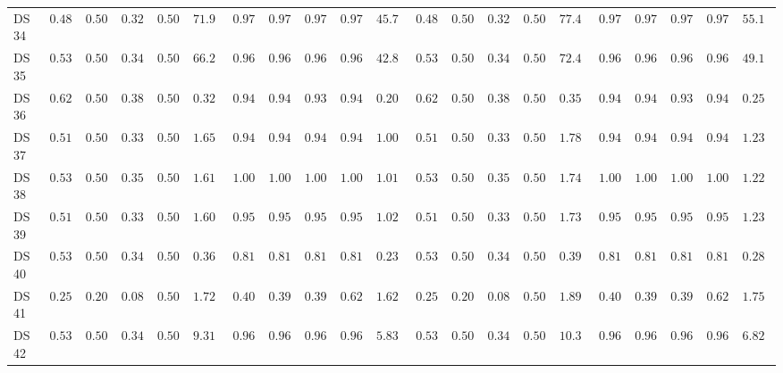 {\begin{longtable}{|l|ccccc|ccccc|ccccc|ccccc|}
		DS 34 & $0.4880$ & $0.5000$ & $0.3280$ & $0.5000$ & $71.9346$ & $0.9747$ & $0.9744$ & $0.9746$ & $0.9744$ & $\boldsymbol{45.7499}$ & $0.4880$ & $0.5000$ & $0.3280$ & $0.5000$ & $77.4863$ & $0.9747$ & $0.9744$ & $0.9746$ & $0.9744$ & $55.1961$ \\
		DS 35 & $0.5333$ & $0.5000$ & $0.3478$ & $0.5000$ & $66.2620$ & $0.9681$ & $0.9682$ & $0.9679$ & $0.9682$ & $\boldsymbol{42.8288}$ & $0.5333$ & $0.5000$ & $0.3478$ & $0.5000$ & $72.4235$ & $0.9681$ & $0.9682$ & $0.9679$ & $0.9682$ & $49.1942$ \\
		DS 36 & $0.6200$ & $0.5000$ & $0.3827$ & $0.5000$ & $0.3280$ & $0.9400$ & $0.9414$ & $0.9369$ & $0.9414$ & $\boldsymbol{0.2028}$ & $0.6200$ & $0.5000$ & $0.3827$ & $0.5000$ & $0.3524$ & $0.9400$ & $0.9414$ & $0.9369$ & $0.9414$ & $0.2504$ \\
		DS 37 & $0.5133$ & $0.5000$ & $0.3392$ & $0.5000$ & $1.6582$ & $0.9469$ & $0.9469$ & $0.9469$ & $0.9469$ & $\boldsymbol{1.0040}$ & $0.5133$ & $0.5000$ & $0.3392$ & $0.5000$ & $1.7881$ & $0.9469$ & $0.9469$ & $0.9469$ & $0.9469$ & $1.2311$ \\
		DS 38 & $0.5398$ & $0.5000$ & $0.3506$ & $0.5000$ & $1.6144$ & $1.0000$ & $1.0000$ & $1.0000$ & $1.0000$ & $\boldsymbol{1.0173}$ & $0.5398$ & $0.5000$ & $0.3506$ & $0.5000$ & $1.7432$ & $\boldsymbol{1.0000}$ & $\boldsymbol{1.0000}$ & $\boldsymbol{1.0000}$ & $\boldsymbol{1.0000}$ & $1.2258$ \\
		DS 39 & $0.5133$ & $0.5000$ & $0.3392$ & $0.5000$ & $1.6080$ & $0.9558$ & $0.9560$ & $0.9557$ & $0.9560$ & $\boldsymbol{1.0290}$ & $0.5133$ & $0.5000$ & $0.3392$ & $0.5000$ & $1.7387$ & $0.9558$ & $0.9560$ & $0.9557$ & $0.9560$ & $1.2360$ \\
		DS 40 & $0.5370$ & $0.5000$ & $0.3494$ & $0.5000$ & $0.3608$ & $0.8148$ & $0.8138$ & $0.8138$ & $0.8138$ & $\boldsymbol{0.2364}$ & $0.5370$ & $0.5000$ & $0.3494$ & $0.5000$ & $0.3951$ & $\boldsymbol{0.8148}$ & $\boldsymbol{0.8138}$ & $\boldsymbol{0.8138}$ & $\boldsymbol{0.8138}$ & $0.2827$ \\
		DS 41 & $0.2586$ & $0.2000$ & $0.0822$ & $0.5000$ & $1.7299$ & $0.4052$ & $0.3969$ & $0.3998$ & $0.6231$ & $\boldsymbol{1.6222}$ & $0.2586$ & $0.2000$ & $0.0822$ & $0.5000$ & $1.8919$ & $0.4052$ & $0.3969$ & $0.3998$ & $0.6231$ & $1.7532$ \\
		DS 42 & $0.5365$ & $0.5000$ & $0.3492$ & $0.5000$ & $9.3138$ & $0.9672$ & $0.9689$ & $0.9671$ & $0.9689$ & $\boldsymbol{5.8347}$ & $0.5365$ & $0.5000$ & $0.3492$ & $0.5000$ & $10.3008$ & $\boldsymbol{0.9672}$ & $\boldsymbol{0.9689}$ & $\boldsymbol{0.9671}$ & $\boldsymbol{0.9689}$ & $6.8293$ \\

\end{longtable}}
